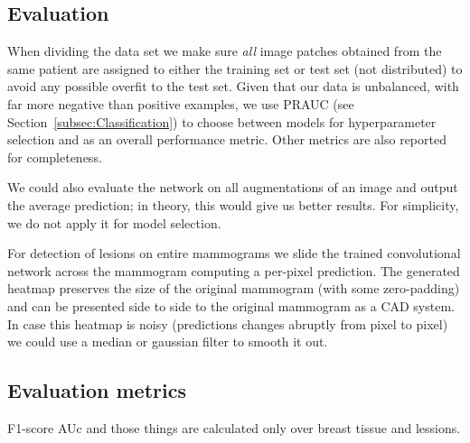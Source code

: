 



	\subsection{Evaluation}
	When dividing the data set we make sure \textit{all} image patches obtained from the same patient are assigned to either the training set or test set (not distributed) to avoid any possible overfit to the test set. Given that our data is unbalanced, with far more negative than positive examples, we use PRAUC (see Section~\ref{subsec:Classification}) to choose between models for hyperparameter selection and as an overall performance metric. Other metrics are also reported for completeness. 

	We could also evaluate the network on all augmentations of an image and output the average prediction; in theory, this would give us better results. For simplicity, we do not apply it for model selection.

	For detection of lesions on entire mammograms we slide the trained convolutional network across the mammogram computing a per-pixel prediction. The generated heatmap preserves the size of the original mammogram (with some zero-padding) and can be presented side to side to the original mammogram as a CAD system. In case this heatmap is noisy (predictions changes abruptly from pixel to pixel) we could use a median or gaussian filter to smooth it out.%
	\subsection{Evaluation metrics}
F1-score AUc and those things are calculated only over breast tissue and lessions.
